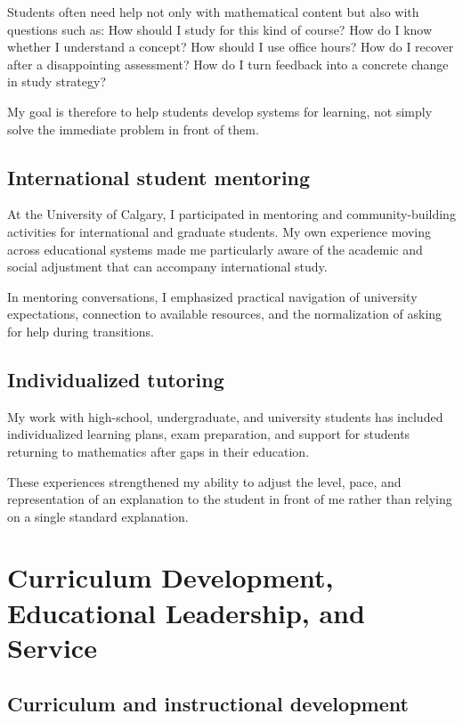 \documentclass[11pt]{article}
\begin{document}
Students often need help not only with mathematical content
but also with questions such as:
How should I study for this kind of course?
How do I know whether I understand a concept?
How should I use office hours?
How do I recover after a disappointing assessment?
How do I turn feedback into a concrete change in study
strategy?

My goal is therefore to help students develop systems for
learning,
not simply solve the immediate problem in front of them.

\subsection{International student mentoring}

At the University of Calgary,
I participated in mentoring and community-building activities
for international and graduate students.
My own experience moving across educational systems made me
particularly aware of the academic and social adjustment that
can accompany international study.

In mentoring conversations,
I emphasized practical navigation of university expectations,
connection to available resources,
and the normalization of asking for help during transitions.

\subsection{Individualized tutoring}

My work with high-school,
undergraduate,
and university students has included individualized learning
plans,
exam preparation,
and support for students returning to mathematics after gaps
in their education.

These experiences strengthened my ability to adjust the level,
pace,
and representation of an explanation to the student in front
of me rather than relying on a single standard explanation.


\section{Curriculum Development,
Educational Leadership,
and Service}

\subsection{Curriculum and instructional development}
\end{document}
